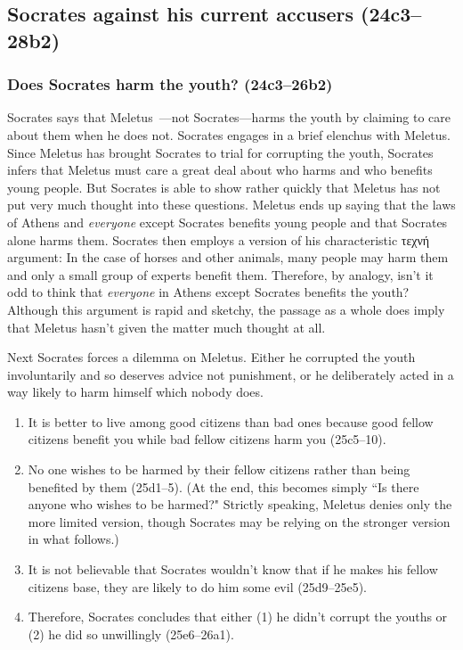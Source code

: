 \documentclass[11pt]{article}
\begin{document}



\subsection{Socrates against his current accusers (24c3--28b2)}

\subsubsection{Does Socrates harm the youth? (24c3--26b2)}

Socrates says that Meletus~---not Socrates---harms the youth by claiming to care about them when he does not. Socrates engages in a brief elenchus with Meletus.  Since Meletus has brought Socrates to trial for corrupting the youth, Socrates infers that Meletus must care a great deal about who harms and who benefits young people. But Socrates is able to show rather quickly that Meletus has not put very much thought into these questions.  Meletus ends up saying that the laws of Athens and \emph{everyone} except Socrates benefits young people and that Socrates alone harms them.  Socrates then employs a version of his characteristic {\g τεχνή} argument: In the case of horses and other animals, many people may harm them and only a small group of experts benefit them. Therefore, by analogy, isn't it odd to think that \emph{everyone} in Athens except Socrates benefits the youth?  Although this argument is rapid and sketchy, the passage as a whole does imply that Meletus hasn't given the matter much thought at all.

Next Socrates forces a dilemma on Meletus. Either he corrupted the youth involuntarily and so deserves advice not punishment, or he deliberately acted in a way likely to harm himself which nobody does.

\begin{enumerate}
    \item It is better to live among good citizens than bad ones because good fellow citizens benefit you while bad fellow citizens harm you (25c5--10).
    \item No one wishes to be harmed by their fellow citizens rather than being benefited by them (25d1--5). (At the end, this becomes simply ``Is there anyone who wishes to be harmed?" Strictly speaking, Meletus denies only the more limited version, though Socrates may be relying on the stronger version in what follows.)
    \item It is not believable that Socrates wouldn't know that if he makes his fellow citizens base, they are likely to do him some evil (25d9--25e5).
    \item Therefore, Socrates concludes that either (1) he didn't corrupt the youths or (2) he did so unwillingly (25e6--26a1).
\end{enumerate}
\end{document}
